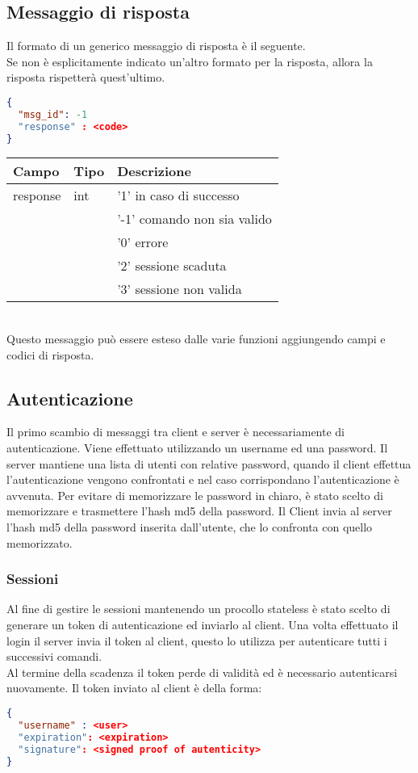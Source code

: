 \subsection{Messaggio di risposta}
Il formato di un generico messaggio di risposta è il seguente.\\
Se non è esplicitamente indicato un'altro formato per la risposta,
 allora la risposta rispetterà quest'ultimo.
\begin{lstlisting}[language=json]
{
  "msg_id": -1
  "response" : <code>
}
\end{lstlisting}

\begin{tabular}{|l | l | l |}
\hline
Campo & Tipo & Descrizione \\ \hline
response & int & '1' in caso di successo  \\
& & '-1' comando non sia valido \\
& & '0' errore \\
& & '2' sessione scaduta \\
& & '3' sessione non valida \\ \hline
\end{tabular}\\
Questo messaggio può essere esteso dalle varie funzioni aggiungendo campi e codici di risposta.\\

\subsection{Autenticazione}
Il primo scambio di messaggi tra client e server è necessariamente di  autenticazione. Viene effettuato utilizzando un username ed una password.
Il server mantiene una lista di utenti con relative password, quando il client effettua l'autenticazione vengono confrontati e nel caso corrispondano l'autenticazione è avvenuta.
Per evitare di memorizzare le password in chiaro, è stato scelto di memorizzare e trasmettere l'hash md5 della password.
Il Client invia al server l'hash md5 della password inserita dall'utente, che lo confronta con quello memorizzato.

\subsubsection{Sessioni}
Al fine di gestire le sessioni  mantenendo un procollo stateless è stato scelto di generare un token di autenticazione ed inviarlo al client.
Una volta effettuato il login il server invia il token al client, questo lo utilizza per autenticare tutti i successivi comandi.\\
Al termine della scadenza il token perde di validità ed è necessario autenticarsi nuovamente.
Il token inviato al client è della forma:
\begin{lstlisting}[language=json]
{
  "username" : <user>
  "expiration": <expiration>
  "signature": <signed proof of autenticity>
}
\end{lstlisting}

